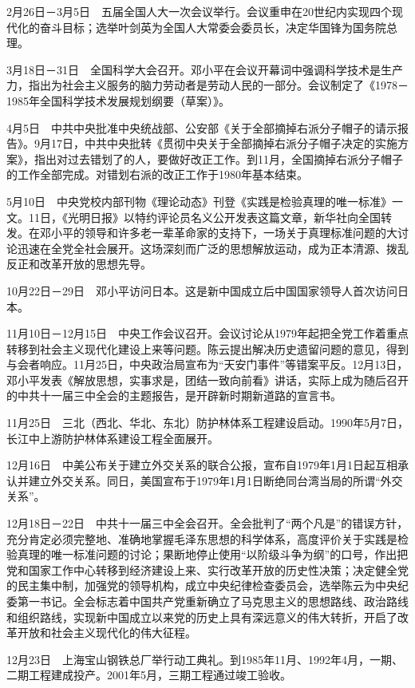 \documentclass[10pt,a4paper,twocolumn]{book}
\begin{document}
2月26日－3月5日　五届全国人大一次会议举行。会议重申在20世纪内实现四个现代化的奋斗目标；选举叶剑英为全国人大常委会委员长，决定华国锋为国务院总理。

3月18日－31日　全国科学大会召开。邓小平在会议开幕词中强调科学技术是生产力，指出为社会主义服务的脑力劳动者是劳动人民的一部分。会议制定了《1978－1985年全国科学技术发展规划纲要（草案）》。

4月5日　中共中央批准中央统战部、公安部《关于全部摘掉右派分子帽子的请示报告》。9月17日，中共中央批转《贯彻中央关于全部摘掉右派分子帽子决定的实施方案》，指出对过去错划了的人，要做好改正工作。到11月，全国摘掉右派分子帽子的工作全部完成。对错划右派的改正工作于1980年基本结束。

5月10日　中央党校内部刊物《理论动态》刊登《实践是检验真理的唯一标准》一文。11日，《光明日报》以特约评论员名义公开发表这篇文章，新华社向全国转发。在邓小平的领导和许多老一辈革命家的支持下，一场关于真理标准问题的大讨论迅速在全党全社会展开。这场深刻而广泛的思想解放运动，成为正本清源、拨乱反正和改革开放的思想先导。

10月22日－29日　邓小平访问日本。这是新中国成立后中国国家领导人首次访问日本。

11月10日－12月15日　中央工作会议召开。会议讨论从1979年起把全党工作着重点转移到社会主义现代化建设上来等问题。陈云提出解决历史遗留问题的意见，得到与会者响应。11月25日，中央政治局宣布为“天安门事件”等错案平反。12月13日，邓小平发表《解放思想，实事求是，团结一致向前看》讲话，实际上成为随后召开的中共十一届三中全会的主题报告，是开辟新时期新道路的宣言书。

11月25日　三北（西北、华北、东北）防护林体系工程建设启动。1990年5月7日，长江中上游防护林体系建设工程全面展开。

12月16日　中美公布关于建立外交关系的联合公报，宣布自1979年1月1日起互相承认并建立外交关系。同日，美国宣布于1979年1月1日断绝同台湾当局的所谓“外交关系”。

12月18日－22日　中共十一届三中全会召开。全会批判了“两个凡是”的错误方针，充分肯定必须完整地、准确地掌握毛泽东思想的科学体系，高度评价关于实践是检验真理的唯一标准问题的讨论；果断地停止使用“以阶级斗争为纲”的口号，作出把党和国家工作中心转移到经济建设上来、实行改革开放的历史性决策；决定健全党的民主集中制，加强党的领导机构，成立中央纪律检查委员会，选举陈云为中央纪委第一书记。全会标志着中国共产党重新确立了马克思主义的思想路线、政治路线和组织路线，实现新中国成立以来党的历史上具有深远意义的伟大转折，开启了改革开放和社会主义现代化的伟大征程。

12月23日　上海宝山钢铁总厂举行动工典礼。到1985年11月、1992年4月，一期、二期工程建成投产。2001年5月，三期工程通过竣工验收。
\end{document}
